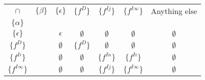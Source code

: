\documentclass[runningheads,a4paper]{llncs}
\newcommand{\drct}{\ensuremath{D}}
\newcommand{\indrct}{\ensuremath{I}}
\begin{document}
\begin{itemize}
{\begin{center}
  \begin{tabular}{|cc|c|c|c|c|c|} \hline
    $\cap$&$\{\beta\} $& $\{\epsilon\}$ & $\{f^{\drct}\}$ & $\{f^{\indrct j}\}$& $\{f^{\indrct\infty}\}$ & Anything else \\
    $\{\alpha\}$ && & & & & \\ \hline \hline
    $\{\epsilon\}$ && $\epsilon$  & $\emptyset$ & $\emptyset$ & $\emptyset$ & $\emptyset$ \\ \hline
    $\{f^{\drct}\}$ && $\emptyset$ & $\{f^{\drct}\}$ & $\emptyset$ & $\emptyset$ & $\emptyset$ \\ \hline
    $\{f^{\indrct i}\}$ && $\emptyset$ & $\emptyset$ & $\{f^{\indrct n}\}$& $\{f^{\indrct i}\}$ & $\emptyset$ \\ \hline
    $\{f^{\indrct\infty}\}$ && $\emptyset$ &$\emptyset$ & $\{f^{\indrct j}\}$& $\{f^{\indrct \infty}\}$ & $\emptyset$ \\ \hline
  \end{tabular} 


\end{center}}
\end{itemize}
\end{document}
